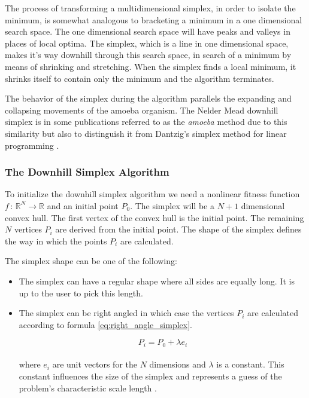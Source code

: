 \documentclass[11pt,a4paper,twoside]{report}
\begin{document}
The process of transforming a multidimensional simplex, in order to
isolate the minimum, is somewhat analogous to bracketing a minimum
in a one dimensional search space. The one dimensional search space will have
peaks and valleys in places of local optima. The simplex, which is a line in one
dimensional space, makes it's way downhill
through this search space, in search of a minimum by means of shrinking and
stretching. When the simplex finds a local minimum, it shrinks itself to contain
only the minimum and the algorithm terminates.

The behavior of the simplex during the algorithm parallels the expanding and
collapsing movements of the amoeba
organism. The Nelder Mead downhill simplex is in
some publications referred to as the \textit{amoeba} method due to this similarity but also to distinguish it from Dantzig's
simplex method for linear programming \cite{Press1992}. 


\subsubsection{The Downhill Simplex Algorithm}

To initialize the downhill simplex algorithm we need a nonlinear fitness function $f\,:\,\mathbb{R}^{N}\rightarrow\mathbb{R}$
and an initial point $P_{0}$. The simplex will be a $N+1$ dimensional convex
hull. The first vertex of the convex hull is the initial point. The remaining
$N$ vertices $P_{i}$ are derived from the initial point. The shape of the simplex defines the way in which the
points $P_{i}$ are calculated\cite{Nelder2009}.

The simplex shape can be one of the following:
\begin{itemize}
\item The simplex can have a regular shape where all sides are equally
long. It is up to the user to pick this length.
\item The simplex can be right angled in which case the vertices
$P_{i}$ are calculated according to formula \ref{eq:right_angle_simplex}.


\begin{equation}\label{eq:right_angle_simplex}
P_{i}=P_{0}+\lambda e_{i}
\end{equation}
\\
where $e_{i}$ are unit vectors for the $N$ dimensions and $\lambda$
is a constant. This constant influences the size of the simplex and
represents a guess of the problem's characteristic scale length \cite{Press1992}.
\end{itemize}
\end{document}
